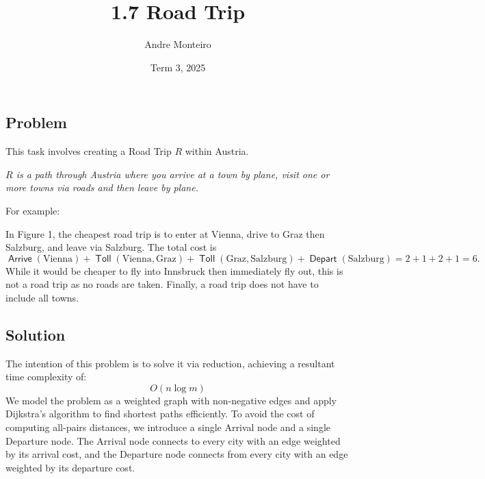 \documentclass[12pt]{article}
\title{1.7 Road Trip}
\author{Andre Monteiro}
\date{Term 3, 2025}
\newcommand{\R}[1]{{\color{myred}#1}}
\newcommand{\B}[1]{{\color{myblue}#1}}
\DeclareMathOperator{\arr}{\mathsf{Arrive}}
\DeclareMathOperator{\dep}{\mathsf{Depart}}
\DeclareMathOperator{\toll}{\mathsf{Toll}}
\begin{document}
\maketitle
\newpage
\subsection*{Problem}
This task involves creating a Road Trip $R$ within Austria.

\emph{$R$ is a path through Austria where you arrive at a town by plane, visit one or more towns via roads and then leave by plane. 
}

For example: 

\begin{figure}[H]
    \centering
    \caption{}
    \label{example-1}
\end{figure}

In Figure 1, the cheapest road trip is to enter at Vienna, drive to Graz then Salzburg, and leave via Salzburg. The total cost is $$\arr(\text{Vienna}) + \toll(\text{Vienna}, \text{Graz}) + \toll(\text{Graz}, \text{Salzburg}) + \dep(\text{Salzburg}) = 2 + 1 + 2 + 1 = 6.$$ While it would be cheaper to fly into Innsbruck then immediately fly out, this is not a road trip as no roads are taken. Finally, a road trip does not have to include all towns.

\newpage

\subsection*{Solution}
The intention of this problem is to solve it via reduction, achieving a resultant time complexity of:
\[
O(n \log m)
\]
We model the problem as a weighted graph with non-negative edges and apply Dijkstra’s algorithm to find shortest paths efficiently.  
To avoid the cost of computing all-pairs distances, we introduce a single Arrival node and a single Departure node.  
The Arrival node connects to every city with an edge weighted by its arrival cost, and the Departure node connects from every city with an edge weighted by its departure cost.
\end{document}
